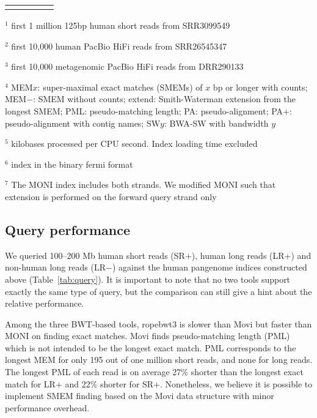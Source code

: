 \documentclass[webpdf,contemporary,large,namedate]{oup-authoring-template}%
\begin{document}
\begin{table}[!tb]
\begin{tabular*}{\columnwidth}{@{\extracolsep\fill}lllrr@{\extracolsep\fill}}
\botrule
\end{tabular*}
\begin{tablenotes}\setlength\itemsep{0.0em}
\item[$^1$] first 1 million 125bp human short reads from SRR3099549
\item[$^2$] first 10,000 human PacBio HiFi reads from SRR26545347
\item[$^3$] first 10,000 metagenomic PacBio HiFi reads from DRR290133
\item[$^4$] MEM$x$: super-maximal exact matches (SMEMs) of $x$ bp or longer with counts;
MEM$-$: SMEM without counts;
extend: Smith-Waterman extension from the longest SMEM;
PML: pseudo-matching length; PA: pseudo-alignment; PA$+$: pseudo-alignment with contig names;
SW$y$: BWA-SW with bandwidth $y$
\item[$^5$] kilobases processed per CPU second. Index loading time excluded
\item[$^6$] index in the binary fermi format
\item[$^7$] The MONI index includes both strands.
We modified MONI such that extension is performed on the forward query strand only
\end{tablenotes}
\end{table}

\subsection{Query performance}

We queried 100--200 Mb human short reads (SR$+$), human long reads (LR$+$) and non-human long reads (LR$-$) against the human pangenome indices constructed above (Table~\ref{tab:query}).
It is important to note that no two tools support exactly the same type of query,
but the comparison can still give a hint about the relative performance.

Among the three BWT-based tools, ropebwt3 is slower than Movi but faster than MONI on finding exact matches.
Movi finds pseudo-matching length (PML) which is not intended to be the longest exact match.
PML corresponds to the longest MEM for only 195 out of one million short reads, and none for long reads.
The longest PML of each read is on average 27\% shorter than the longest exact match for LR$+$ and 22\% shorter for SR$+$.
Nonetheless, we believe it is possible to implement SMEM finding based on the Movi data structure with minor performance overhead.
\end{document}
